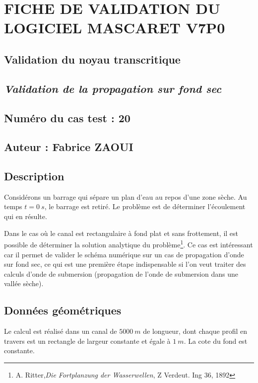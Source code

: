\documentclass[a4paper,10pt]{article}
\begin{document}
\section*{FICHE DE VALIDATION DU LOGICIEL MASCARET V7P0}

\subsection*{Validation du noyau transcritique}

\subsection*{\emph{Validation de la propagation sur fond sec}}

\subsection*{Numéro du cas test : 20}

\subsection*{Auteur : Fabrice ZAOUI}


\vspace{1cm}

\subsection*{Description}

Considérons un barrage qui sépare un plan d'eau au repos d'une zone sèche. Au temps $t = 0\ s$, le barrage est retiré. Le problème est de déterminer l'écoulement qui en résulte.

Dans le cas o\`{u} le canal est rectangulaire à fond plat et sans frottement, il est possible de déterminer la solution analytique du problème\footnote{A. Ritter,\emph{Die Fortplanzung der Wasserwellen}, Z Verdeut. Ing 36, 1892}. Ce cas est intéressant car il permet de valider le schéma numérique sur un cas de propagation d'onde sur fond sec, ce qui est une première étape indispensable si l'on veut traiter des calculs d'onde de submersion (propagation de l'onde de submersion dans une vallée sèche).

\subsection*{Données géométriques}

Le calcul est réalisé dans un canal de $5000\ m$ de longueur, dont chaque profil en travers est un rectangle de largeur constante et égale à $1\ m$. La cote du fond est constante.
\end{document}
